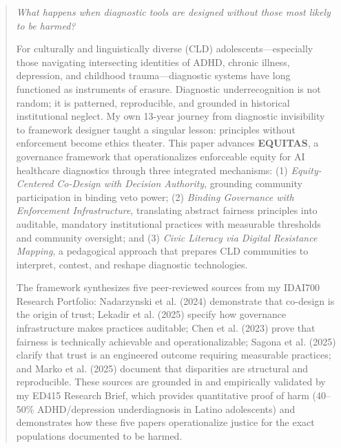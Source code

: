 \documentclass[12pt,a4paper]{article}
\begin{document}
\clearpage

\begin{abstract}

\textit{What happens when diagnostic tools are designed without those most likely to be harmed?}

For culturally and linguistically diverse (CLD) adolescents—especially those navigating intersecting identities of ADHD, chronic illness, depression, and childhood trauma—diagnostic systems have long functioned as instruments of erasure. Diagnostic underrecognition is not random; it is patterned, reproducible, and grounded in historical institutional neglect. My own 13-year journey from diagnostic invisibility to framework designer taught a singular lesson: principles without enforcement become ethics theater. This paper advances \textbf{EQUITAS}, a governance framework that operationalizes enforceable equity for AI healthcare diagnostics through three integrated mechanisms: (1) \textit{Equity-Centered Co-Design with Decision Authority}, grounding community participation in binding veto power; (2) \textit{Binding Governance with Enforcement Infrastructure}, translating abstract fairness principles into auditable, mandatory institutional practices with measurable thresholds and community oversight; and (3) \textit{Civic Literacy via Digital Resistance Mapping}, a pedagogical approach that prepares CLD communities to interpret, contest, and reshape diagnostic technologies.

\vspace{0.5em}

The framework synthesizes five peer-reviewed sources from my IDAI700 Research Portfolio: Nadarzynski et al. (2024) demonstrate that co-design is the origin of trust; Lekadir et al. (2025) specify how governance infrastructure makes practices auditable; Chen et al. (2023) prove that fairness is technically achievable and operationalizable; Sagona et al. (2025) clarify that trust is an engineered outcome requiring measurable practices; and Marko et al. (2025) document that disparities are structural and reproducible. These sources are grounded in and empirically validated by my ED415 Research Brief, which provides quantitative proof of harm (40--50\% ADHD/depression underdiagnosis in Latino adolescents) and demonstrates how these five papers operationalize justice for the exact populations documented to be harmed.

\vspace{0.5em}


\end{abstract}
\end{document}
